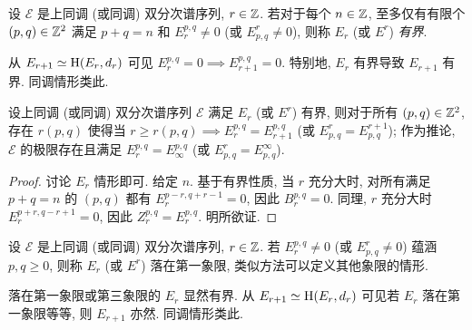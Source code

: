 \begin{definition}\label{def:bdd-ss}
	设 $\mathscr{E}$ 是上同调 (或同调) 双分次谱序列, $r \in \mathbb{Z}$. 若对于每个 $n \in \mathbb{Z}$, 至多仅有有限个 $(p,q) \in \mathbb{Z}^2$ 满足 $p+q=n$ 和 $E_r^{p,q} \neq 0$ (或 $E^r_{p,q} \neq 0$), 则称 $E_r$ (或 $E^r$) \emph{有界}.
\end{definition}

从 $E_{r+1} \simeq \operatorname{H}(E_r, d_r)$ 可见 $E_r^{p,q}=0 \implies E_{r+1}^{p,q} = 0$. 特别地, $E_r$ 有界导致 $E_{r+1}$ 有界. 同调情形类此.

\begin{proposition}
	设上同调 (或同调) 双分次谱序列 $\mathscr{E}$ 满足 $E_r$ (或 $E^r$) 有界, 则对于所有 $(p,q) \in \mathbb{Z}^2$, 存在 $r(p,q)$ 使得当 $r \geq r(p,q) \implies E_r^{p,q} = E_{r+1}^{p,q}$ (或 $E^r_{p,q} = E^{r+1}_{p,q}$); 作为推论, $\mathscr{E}$ 的极限存在且满足 $E_r^{p,q} = E_\infty^{p,q}$ (或 $E^r_{p,q} = E^\infty_{p,q}$).
\end{proposition}
\begin{proof}
	讨论 $E_r$ 情形即可. 给定 $n$. 基于有界性质, 当 $r$ 充分大时, 对所有满足 $p+q=n$ 的 $(p,q)$ 都有 $E_r^{p-r, q+r-1} = 0$, 因此 $B_r^{p,q} = 0$. 同理, $r$ 充分大时 $E_r^{p+r, q-r+1} = 0$, 因此 $Z_r^{p,q} = E_r^{p,q}$. 明所欲证.
\end{proof}

\begin{definition}\label{def:quadrant-ss}
	设 $\mathscr{E}$ 是上同调 (或同调) 双分次谱序列, $r \in \mathbb{Z}$. 若 $E_r^{p,q} \neq 0$ (或 $E^r_{p,q} \neq 0$) 蕴涵 $p, q \geq 0$, 则称 $E_r$ (或 $E^r$) 落在第一象限, 类似方法可以定义其他象限的情形.
\end{definition}

落在第一象限或第三象限的 $E_r$ 显然有界. 从 $E_{r+1} \simeq \operatorname{H}(E_r, d_r)$ 可见若 $E_r$ 落在第一象限等等, 则 $E_{r+1}$ 亦然. 同调情形类此.

